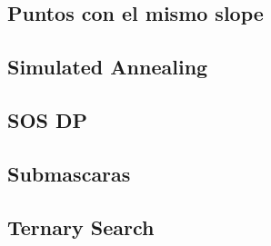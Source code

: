 \subsection{	Puntos con el mismo slope}
\raggedbottom
\hrulefill
\subsection{	Simulated Annealing}
\raggedbottom
\hrulefill
\subsection{	SOS DP}
\raggedbottom
\hrulefill
\subsection{	Submascaras}
\raggedbottom
\hrulefill
\subsection{	Ternary Search}
\raggedbottom
\hrulefill

